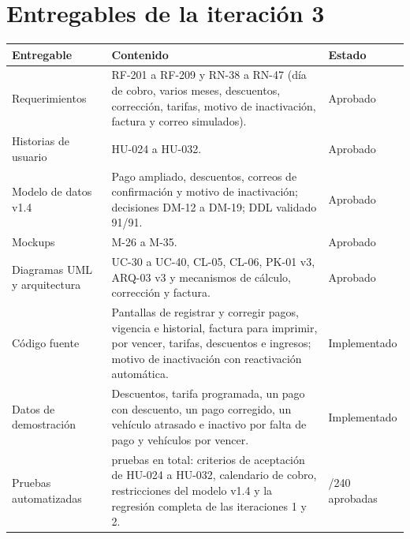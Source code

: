 \section{Entregables de la iteración 3}
\begin{longtable}{>{\raggedright\arraybackslash}p{5.2cm}>{\raggedright\arraybackslash}p{6.6cm}>{\raggedright\arraybackslash}p{2.6cm}}
\toprule
\textbf{Entregable} & \textbf{Contenido} & \textbf{Estado}\\
\midrule\endhead
Requerimientos & RF-201 a RF-209 y RN-38 a RN-47 (día de cobro, varios meses, descuentos, corrección, tarifas, motivo de inactivación, factura y correo simulados). & Aprobado\\
Historias de usuario & HU-024 a HU-032. & Aprobado\\
Modelo de datos v1.4 & Pago ampliado, descuentos, correos de confirmación y motivo de inactivación; decisiones DM-12 a DM-19; DDL validado 91/91. & Aprobado\\
Mockups & M-26 a M-35. & Aprobado\\
Diagramas UML y arquitectura & UC-30 a UC-40, CL-05, CL-06, PK-01 v3, ARQ-03 v3 y mecanismos de cálculo, corrección y factura. & Aprobado\\
Código fuente & Pantallas de registrar y corregir pagos, vigencia e historial, factura para imprimir, por vencer, tarifas, descuentos e ingresos; motivo de inactivación con reactivación automática. & Implementado\\
Datos de demostración & Descuentos, tarifa programada, un pago con descuento, un pago corregido, un vehículo atrasado e inactivo por falta de pago y vehículos por vencer. & Implementado\\
Pruebas automatizadas & 240 pruebas en total: criterios de aceptación de HU-024 a HU-032, calendario de cobro, restricciones del modelo v1.4 y la regresión completa de las iteraciones 1 y 2. & 240/240 aprobadas\\
\bottomrule
\end{longtable}

